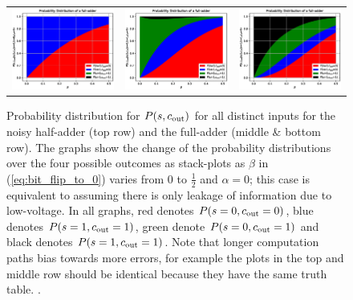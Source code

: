 \begin{figure}
\begin{tabular}{ccc}
        \includegraphics[width=.3\textwidth]{media/noisy_full_adder_value_dist_001.eps} &
        \includegraphics[width=.3\textwidth]{media/noisy_full_adder_value_dist_011.eps} &
        \includegraphics[width=.3\textwidth]{media/noisy_full_adder_value_dist_111.eps} \\
    \end{tabular}
    \caption{Probability distribution for $P(s,c_{\mathrm{out}})$ for all distinct inputs for the noisy half-adder (top row) and the full-adder (middle \& bottom row). The graphs show the change of the probability distributions over the four possible outcomes as stack-plots as $\beta$ in (\ref{eq:bit_flip_to_0}) varies from $0$ to $\frac{1}{2}$ and $\alpha = 0$; this case is equivalent to assuming there is only leakage of information due to low-voltage. In all graphs, red denotes $P(s=0,c_{\mathrm{out}}=0)$, blue denotes $P(s=1,c_{\mathrm{out}}=1)$, green denote $P(s=0,c_{\mathrm{out}}=1)$ and black denotes $P(s=1,c_{\mathrm{out}}=1)$. Note that longer computation paths bias towards more errors, for example the plots in the top and middle row should be identical because they have the same truth table. \label{fig:noise_prob_dist}.}
\end{figure}

